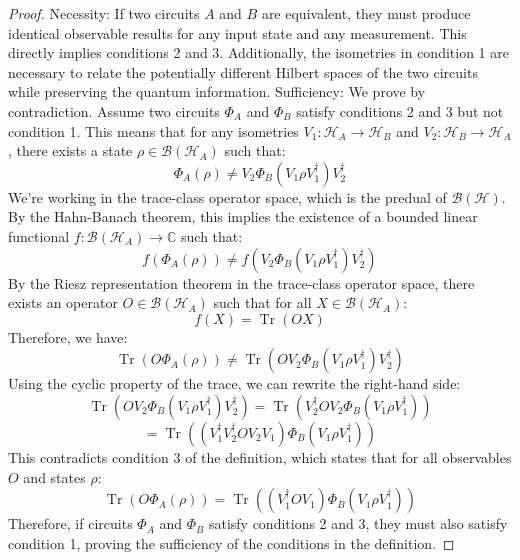 \documentclass[11pt,a4paper]{article}
\DeclareMathOperator{\Tr}{Tr}
\begin{document}
\begin{proof}
Necessity:
If two circuits $A$ and $B$ are equivalent, they must produce identical observable results for any input state and any measurement. This directly implies conditions 2 and 3. Additionally, the isometries in condition 1 are necessary to relate the potentially different Hilbert spaces of the two circuits while preserving the quantum information.
Sufficiency:
We prove by contradiction. Assume two circuits $\Phi_A$ and $\Phi_B$ satisfy conditions 2 and 3 but not condition 1. This means that for any isometries $V_1: \mathcal{H}_A \to \mathcal{H}_B$ and $V_2: \mathcal{H}_B \to \mathcal{H}_A$, there exists a state $\rho \in \mathcal{B}(\mathcal{H}_A)$ such that:
\begin{equation}
\Phi_A(\rho) \neq V_2 \Phi_B(V_1 \rho V_1^\dagger) V_2^\dagger
\end{equation}
We're working in the trace-class operator space, which is the predual of $\mathcal{B}(\mathcal{H})$. By the Hahn-Banach theorem\cite{Conway1990}, this implies the existence of a bounded linear functional $f: \mathcal{B}(\mathcal{H}_A) \to \mathbb{C}$ such that:
\begin{equation}
f(\Phi_A(\rho)) \neq f(V_2 \Phi_B(V_1 \rho V_1^\dagger) V_2^\dagger)
\end{equation}
By the Riesz representation theorem in the trace-class operator space\cite{Conway1990}, there exists an operator $O \in \mathcal{B}(\mathcal{H}_A)$ such that for all $X \in \mathcal{B}(\mathcal{H}_A)$:
\begin{equation}
f(X) = \Tr(OX)
\end{equation}
Therefore, we have:
\begin{equation}
\Tr(O \Phi_A(\rho)) \neq \Tr(O V_2 \Phi_B(V_1 \rho V_1^\dagger) V_2^\dagger)
\end{equation}
Using the cyclic property of the trace, we can rewrite the right-hand side:
\[
\Tr(O V_2 \Phi_B(V_1 \rho V_1^\dagger) V_2^\dagger) = \Tr(V_2^\dagger O V_2 \Phi_B(V_1 \rho V_1^\dagger))  \]\[
= \Tr((V_1^\dagger V_2^\dagger O V_2 V_1) \Phi_B(V_1 \rho V_1^\dagger))
\]
This contradicts condition 3 of the definition, which states that for all observables $O$ and states $\rho$:
\begin{equation}
\Tr(O \Phi_A(\rho)) = \Tr((V_1^\dagger O V_1) \Phi_B(V_1 \rho V_1^\dagger))
\end{equation}
Therefore, if circuits $\Phi_A$ and $\Phi_B$ satisfy conditions 2 and 3, they must also satisfy condition 1, proving the sufficiency of the conditions in the definition.
\end{proof}
\end{document}
